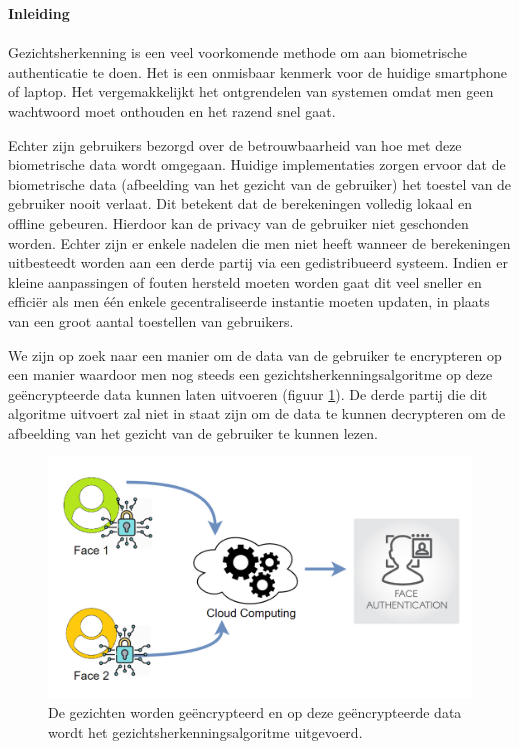 \textbf{\Large{Inleiding}}\\\\
Gezichtsherkenning is een veel voorkomende methode om aan biometrische authenticatie te doen. Het is een onmisbaar kenmerk voor de huidige smartphone of laptop. Het vergemakkelijkt het ontgrendelen van systemen omdat men geen wachtwoord moet onthouden en het razend snel gaat.

Echter zijn gebruikers bezorgd over de betrouwbaarheid van hoe met deze biometrische data wordt omgegaan. Huidige implementaties zorgen ervoor dat de biometrische data (afbeelding van het gezicht van de gebruiker) het toestel van de gebruiker nooit verlaat. Dit betekent dat de berekeningen volledig lokaal en offline gebeuren. Hierdoor kan de privacy van de gebruiker niet geschonden worden. Echter zijn er enkele nadelen die men niet heeft wanneer de berekeningen uitbesteedt worden aan een derde partij via een gedistribueerd  systeem. Indien er kleine aanpassingen of fouten hersteld moeten worden gaat dit veel sneller en effici\"er als men \'e\'en enkele gecentraliseerde instantie moeten updaten, in plaats van een groot aantal toestellen van gebruikers.

We zijn op zoek naar een manier om de data van de gebruiker te encrypteren op een manier waardoor men nog steeds een gezichtsherkenningsalgoritme op deze ge\"encrypteerde data kunnen laten uitvoeren (figuur \ref{fig:dutch_intro_overview}). De derde partij die dit algoritme uitvoert zal niet in staat zijn om de data te kunnen decrypteren om de afbeelding van het gezicht van de gebruiker te kunnen lezen.

\begin{figure}[H]
  \includegraphics[scale=0.4]{fig/intro_overview.png}
  \centering
  \caption{De gezichten worden ge\"encrypteerd  en op deze ge\"encrypteerde data wordt het gezichtsherkenningsalgoritme uitgevoerd.}
  \label{fig:dutch_intro_overview}
\end{figure}

